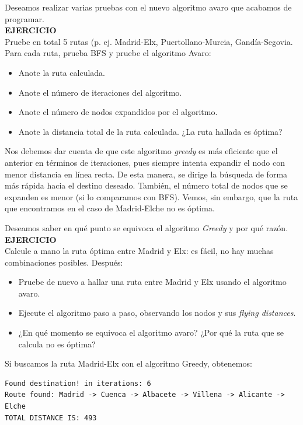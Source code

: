 \documentclass{article}
\begin{document}
\begin{exercise}
    Deseamos realizar varias pruebas con el nuevo algoritmo avaro que acabamos de programar.\\
    
    \textbf{EJERCICIO}\\
    Pruebe en total 5 rutas (p. ej. Madrid-Elx, Puertollano-Murcia, Gandía-Segovia. Para cada ruta, prueba BFS y pruebe el algoritmo Avaro:
    \begin{itemize}
        \item Anote la ruta calculada.
        \item Anote el número de iteraciones del algoritmo.
        \item Anote el número de nodos expandidos por el  algoritmo.
        \item Anote la distancia total de la ruta calculada. ¿La ruta hallada es óptima?
    \end{itemize}     
\end{exercise}

Nos debemos dar cuenta de que este algoritmo \textit{greedy} es más eficiente que el anterior en términos de iteraciones, pues siempre intenta expandir el nodo con menor distancia en línea recta. De esta manera, se dirige la búsqueda de forma más rápida hacia el destino deseado. También, el número total de nodos que se expanden es menor (si lo comparamos con BFS). Vemos, sin embargo, que la ruta que encontramos en el caso de Madrid-Elche no es óptima.

\begin{exercise}
Deseamos saber en qué punto se equivoca el algoritmo \textit{Greedy} y por qué razón.\\

\textbf{EJERCICIO}\\
Calcule a mano la ruta óptima entre Madrid y Elx: es fácil, no hay muchas combinaciones posibles. Después:
\begin{itemize}
    \item Pruebe de nuevo a hallar una ruta entre Madrid y Elx usando el algoritmo avaro.
    \item Ejecute el algoritmo paso a paso, observando los nodos y sus \textit{flying distances}.
    \item ¿En qué momento se equivoca el algoritmo avaro? ¿Por qué la ruta que se calcula no es óptima?
\end{itemize} 
\end{exercise}

Si buscamos la ruta Madrid-Elx con el algoritmo Greedy, obtenemos:
\begin{verbatim}
Found destination! in iterations: 6
Route found: Madrid -> Cuenca -> Albacete -> Villena -> Alicante -> Elche
TOTAL DISTANCE IS: 493
\end{verbatim}
\end{document}
